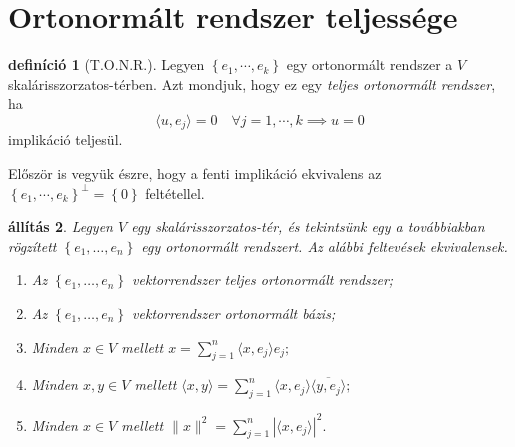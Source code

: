 \documentclass[9pt, a4paper, showtrims]{memoir}
\theoremstyle{plain}
\newtheorem{proposition}{állítás}[chapter]
\theoremstyle{remark}
\theoremstyle{definition}
\newtheorem{definition}[proposition]{definíció}
\newcommand{\ip}[2]{\langle#1,#2\rangle}
\begin{document}
\section{Ortonormált rendszer teljessége}
\begin{definition}[T.O.N.R.]
    Legyen $\left\{ e_1,\cdots,e_k \right\}$ egy ortonormált rendszer a $V$ skalárisszorzatos-térben.
    Azt mondjuk, hogy ez egy \emph{teljes ortonormált rendszer}, ha
    \[
        \ip{u}{e_j}=0\quad\forall j=1,\cdots,k \implies u=0
    \]
    implikáció teljesül.
\end{definition}
Először is vegyük észre, hogy a fenti implikáció ekvivalens az 
$\left\{ e_1,\cdots,e_k \right\}^\perp =\left\{ 0 \right\}$
feltétellel.

\begin{proposition}
    Legyen $V$ egy skalárisszorzatos-tér, 
    és tekintsünk egy a továbbiakban rögzített 
    $\left\{ e_1,\dots,e_n \right\}$ egy ortonormált rendszert.
    Az alábbi feltevések ekvivalensek.
    \begin{enumerate}
        \item
            Az $\left\{ e_1,\dots,e_n \right\}$ vektorrendszer teljes ortonormált rendszer;
        \item 
            Az $\left\{ e_1,\dots,e_n \right\}$ vektorrendszer ortonormált bázis;
        \item
            Minden $x\in V$ mellett 
            \(
                x=
                \sum_{j=1}^n\ip{x}{e_j}e_j;
            \)
        \item
            Minden $x,y\in V$ mellett
            \(
                \ip{x}{y}=
                \sum_{j=1}^n\ip{x}{e_j}\overline{\ip{y}{e_j}};
            \)
        \item
            Minden $x\in V$ mellett
            \(
                \|x\|^2=
                \sum_{j=1}^n|\ip{x}{e_j}|^2.
            \)
                \qedhere
    \end{enumerate}
\end{proposition}
\end{document}
